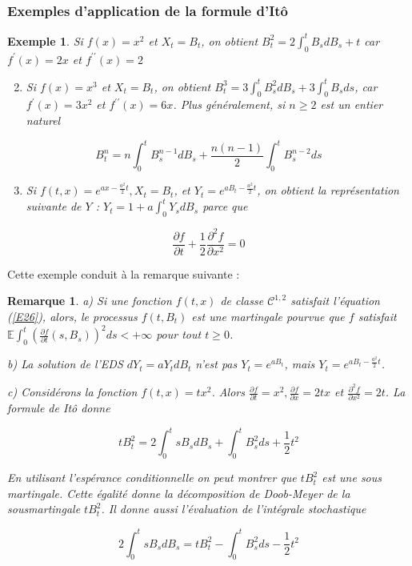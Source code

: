 \documentclass[A4paper,12pt]{report}
\newtheorem{remark}{Remarque}[chapter]
\newtheorem{example}{Exemple}[chapter]
\newcommand{\E}{{\mathbb{E}}}
\begin{document}
\subsubsection{Exemples d'application de la formule d'Itô}
\begin{example} Si $f(x)=x^{2}$ et $X_{t}=B_{t}$, on obtient $B_{t}^{2}=2 \int_{0}^{t} B_{s} d B_{s}+t$ car $f^{\prime}(x)=2 x$ et $f^{\prime \prime}(x)=2$

\begin{enumerate}
  \setcounter{enumi}{1}
  \item Si $f(x)=x^{3}$ et $X_{t}=B_{t}$, on obtient $B_{t}^{3}=3 \int_{0}^{t} B_{s}^{2} d B_{s}+3 \int_{0}^{t} B_{s} d s$, car $f^{\prime}(x)=3 x^{2}$ et $f^{\prime \prime}(x)=6 x$. Plus généralement, si $n \geq 2$ est un entier naturel
\end{enumerate}

$$
B_{t}^{n}=n \int_{0}^{t} B_{s}^{n-1} d B_{s}+\frac{n(n-1)}{2} \int_{0}^{t} B_{s}^{n-2} d s
$$

\begin{enumerate}
  \setcounter{enumi}{2}
  \item Si $f(t, x)=e^{a x-\frac{a^{2}}{2} t}, X_{t}=B_{t}$, et $Y_{t}=e^{a B_{t}-\frac{a^{2}}{2} t}$, on obtient la représentation suivante de $Y$ : $Y_{t}=1+a \int_{0}^{t} Y_{s} d B_{s}$ parce que
\end{enumerate}

\begin{equation}\label{E26}
\frac{\partial f}{\partial t}+\frac{1}{2} \frac{\partial^{2} f}{\partial x^{2}}=0
\end{equation}

\end{example} 
Cette exemple conduit à la remarque suivante :
\begin{remark}
a) Si une fonction $f(t, x)$ de classe $\mathcal{C}^{1,2}$ satisfait l'équation (\ref{E26}), alors, le processus $f\left(t, B_{t}\right)$ est une martingale pourvue que $f$ satisfait $\E \int_{0}^{t}\left(\frac{\partial f}{\partial t}\left(s, B_{s}\right)\right)^{2} d s<+\infty$ pour tout $t \geq 0$.

b) La solution de l'EDS $d Y_{t}=a Y_{t} d B_{t}$ n'est pas $Y_{t}=e^{a B_{t}}$, mais $Y_{t}=e^{a B_{t}-\frac{a^{2}}{2} t}$.

c) Considérons la fonction $f(t, x)=t x^{2}$. Alors $\frac{\partial f}{\partial t}=x^{2}, \frac{\partial f}{\partial x}=2 t x$ et $\frac{\partial^{2} f}{\partial x^{2}}=2 t$. La formule de Itô donne

$$
t B_{t}^{2}=2 \int_{0}^{t} s B_{s} d B_{s}+\int_{0}^{t} B_{s}^{2} d s+\frac{1}{2} t^{2}
$$

En utilisant l'espérance conditionnelle on peut montrer que $t B_{t}^{2}$ est une sous martingale. Cette égalité donne la décomposition de Doob-Meyer de la sousmartingale $t B_{t}^{2}$. Il donne aussi l'évaluation de l'intégrale stochastique

$$
2 \int_{0}^{t} s B_{s} d B_{s}=t B_{t}^{2}-\int_{0}^{t} B_{s}^{2} d s-\frac{1}{2} t^{2}
$$
\end{remark}
\end{document}
